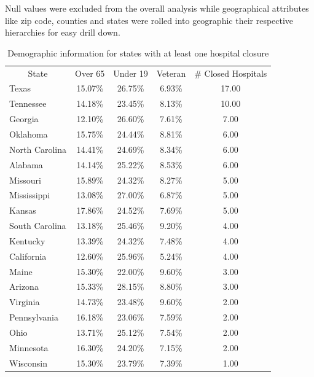 \documentclass[10pt,conference]{IEEEtran}
\begin{document}
Null values were excluded from the overall analysis while geographical attributes like zip code, counties and states were rolled into geographic their respective hierarchies for easy drill down. 
\begin{table}[htbp]
\begin{center}
  \caption{Demographic information for states with at least one hospital closure}
    \begin{tabular}{|l|c|c|c|c|}
    \hline
    \multicolumn{1}{|c|}{State} & \multicolumn{1}{|c|}{Over 65} & \multicolumn{1}{|c|}{Under 19} & \multicolumn{1}{|c|}{Veteran} & \multicolumn{1}{|c|}{\# Closed Hospitals} \\
    \hhline{|=|=|=|=|=|}
    Texas & 15.07\% & 26.75\% & 6.93\% & 17.00 \\
    \hline
    Tennessee & 14.18\% & 23.45\% & 8.13\% & 10.00 \\
    \hline
    Georgia & 12.10\% & 26.60\% & 7.61\% & 7.00 \\
    \hline
    Oklahoma & 15.75\% & 24.44\% & 8.81\% & 6.00 \\
    \hline
    North Carolina & 14.41\% & 24.69\% & 8.34\% & 6.00 \\
    \hline
    Alabama & 14.14\% & 25.22\% & 8.53\% & 6.00 \\
    \hline
    Missouri & 15.89\% & 24.32\% & 8.27\% & 5.00 \\
    \hline
    Mississippi & 13.08\% & 27.00\% & 6.87\% & 5.00 \\
    \hline
    Kansas & 17.86\% & 24.52\% & 7.69\% & 5.00 \\
    \hline
    South Carolina & 13.18\% & 25.46\% & 9.20\% & 4.00 \\
    \hline
    Kentucky & 13.39\% & 24.32\% & 7.48\% & 4.00 \\
    \hline
    California & 12.60\% & 25.96\% & 5.24\% & 4.00 \\
    \hline
    Maine & 15.30\% & 22.00\% & 9.60\% & 3.00 \\
    \hline
    Arizona & 15.33\% & 28.15\% & 8.80\% & 3.00 \\
    \hline
    Virginia & 14.73\% & 23.48\% & 9.60\% & 2.00 \\
    \hline
    Pennsylvania & 16.18\% & 23.06\% & 7.59\% & 2.00 \\
    \hline
    Ohio  & 13.71\% & 25.12\% & 7.54\% & 2.00 \\
    \hline
    Minnesota & 16.30\% & 24.20\% & 7.15\% & 2.00 \\
    \hline
    Wisconsin & 15.30\% & 23.79\% & 7.39\% & 1.00 \\

\end{tabular}
\end{center}
\end{table}
\end{document}
